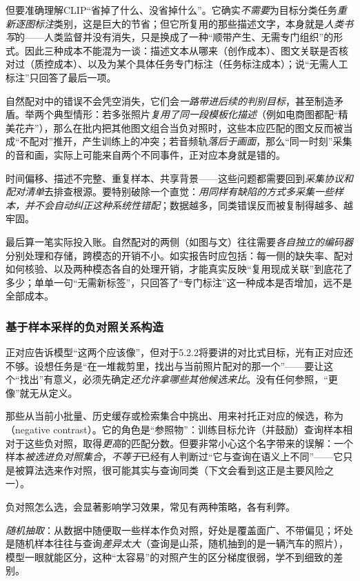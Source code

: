 但要准确理解CLIP“省掉了什么、没省掉什么”。它确实\emph{不需要}为目标分类任务\emph{重新逐图标注}类别，这是巨大的节省；但它所复用的那些描述文字，本身就是\emph{人类书写}的——人类监督并没有消失，只是换成了一种“顺带产生、无需专门组织”的形式。因此三种成本不能混为一谈：描述文本从哪来（创作成本）、图文关联是否核对过（质控成本）、以及为某个具体任务专门标注（任务标注成本）；说“无需人工标注”只回答了最后一项。

自然配对中的错误不会凭空消失，它们会\emph{一路带进后续的判别目标}，甚至制造矛盾。举两个典型情形：若多张照片\emph{复用了同一段模板化描述}（例如电商图都配“精美花卉”），那么在批内把其他图文组合当负对照时，这些本应匹配的图文反而被当成“不配对”推开，产生训练上的冲突；若音频轨\emph{落后于画面}，那么“同一时刻”采集的音和画，实际上可能来自两个不同事件，正对应本身就是错的。

时间偏移、描述不完整、重复样本、共享背景——这些问题都需要回到\emph{采集协议和配对清单}去排查根源。要特别破除一个直觉：\emph{用同样有缺陷的方式多采集一些样本，并不会自动纠正这种系统性错配}；数据越多，同类错误反而被复制得越多、越牢固。

最后算一笔实际投入账。自然配对的两侧（如图与文）往往需要\emph{各自独立的编码器}分别处理和存储，跨模态的开销不小。如实报告时应包括：每一侧的缺失率、配对如何核验、以及两种模态各自的处理开销，才能真实反映“复用现成关联”到底花了多少；单单一句“无需新标签”，只回答了“专门标注”这一种成本是否增加，远不是全部成本。

\subsubsection{基于样本采样的负对照关系构造}
\label{sec:data-derived-knowledge-negative-sampling}

正对应告诉模型“这两个应该像”，但对于5.2.2将要讲的对比式目标，光有正对应还不够。设想任务是“在一堆裁剪里，找出与当前照片配对的那一个”——要让这个“找出”有意义，必须先确定\emph{还允许拿哪些其他候选来比}。没有任何参照，“更像”就无从定义。

那些从当前小批量、历史缓存或检索集合中挑出、用来衬托正对应的候选，称为（negative contrast）。它的角色是“参照物”：训练目标允许（并鼓励）查询样本相对于这些负对照，取得\emph{更高}的匹配分数。但要非常小心这个名字带来的误解：一个样本\emph{被选进负对照集合}，\emph{不等于}已经有人判断过“它与查询在语义上不同”——它只是被算法选来作对照，很可能其实与查询同类（下文会看到这正是主要风险之一）。

负对照怎么选，会显著影响学习效果，常见有两种策略，各有利弊。

\emph{随机抽取}：从数据中随便取一些样本作负对照，好处是覆盖面广、不带偏见；坏处是随机样本往往与查询\emph{差异太大}（查询是山茶，随机抽到的是一辆汽车的照片），模型一眼就能区分，这种“太容易”的对照产生的区分梯度很弱，学不到细致的差别。


